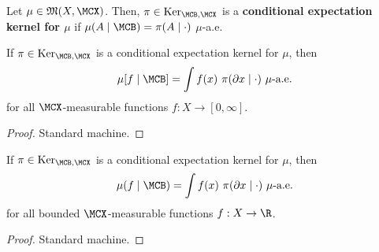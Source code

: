 \begin{definition}
    \label{def:cond-exp-ker}
    \leanok{}

    Let $\mu\in\mathfrak{M}(X,\MCX)$. Then, $\pi\in\text{Ker}_{\MCB,\MCX}$ is a \textbf{conditional expectation kernel for $\mu$} if $\mu(A\mid \MCB)=\pi(A\mid\cdot)$ $\mu$-a.e.
\end{definition}

\begin{lemma}
    \label{lem:cond-exp-proper-ker-lintegral}

    If $\pi \in \text{Ker}_{\MCB, \MCX}$ is a conditional expectation kernel for $\mu$, then
    \[\mu[f\mid \MCB] = \int f(x)\ \pi(\partial x\mid\cdot)\ \mu\text{-a.e.}\]
    for all $\MCX$-measurable functions $f : X \to [0, \infty]$.
\end{lemma}
\begin{proof}

    Standard machine.
\end{proof}

\begin{lemma}
    \label{lem:cond-exp-proper-ker-integral}
    \leanok

    If $\pi \in \text{Ker}_{\MCB, \MCX}$ is a conditional expectation kernel for $\mu$, then
    $$\mu(f\mid \MCB) = \int f(x)\ \pi(\partial x\mid\cdot)\ \mu\text{-a.e.}$$
    for all bounded $\MCX$-measurable functions $f : X \to \R$.
\end{lemma}
\begin{proof}

    Standard machine.
\end{proof}

